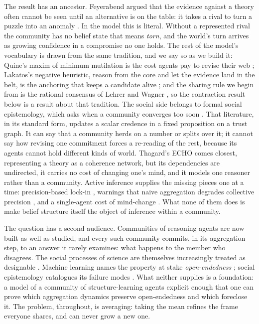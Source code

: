 The result has an ancestor. Feyerabend argued that the evidence against a theory often
cannot be seen until an alternative is on the table: it takes a rival to turn a puzzle into
an anomaly \citep{feyerabend1975}. In the model this is literal. Without a represented rival
the community has no belief state that means \emph{torn}, and the world's turn arrives as
growing confidence in a compromise no one holds. The rest of the model's vocabulary is drawn
from the same tradition, and we say so as we build it: Quine's maxim of minimum mutilation
is the cost agents pay to revise their web \citep{quine1978}; Lakatos's negative heuristic,
reason from the core and let the evidence land in the belt, is the anchoring that keeps a
candidate alive \citep{lakatos1970}; and the sharing rule we begin from is the rational
consensus of Lehrer and Wagner \citep{lehrer1981,degroot1974}, so the contraction result
below is a result about that tradition. The social side belongs to formal social
epistemology, which asks when a community converges too soon
\citep{zollman2010,zollman2013,oconnor2019,jonard2025,michelini2023}. That literature, in
its standard form, updates a scalar credence in a fixed proposition on a trust graph. It can
say that a community herds on a number or splits over it; it cannot say how revising one
commitment forces a re-reading of the rest, because its agents cannot hold different kinds
of world. Thagard's ECHO \citep{thagard1989,thagard1990} comes closest, representing a
theory as a coherence network, but its dependencies are undirected, it carries no cost of
changing one's mind, and it models one reasoner rather than a community. Active inference
supplies the missing pieces one at a time: precision-based lock-in \citep{albarracin2022},
warnings that naive aggregation degrades collective precision
\citep{friston2023federated,waade2025}, and a single-agent cost of mind-change
\citep{hyland2025}. What none of them does is make belief structure itself the object of
inference within a community.

The question has a second audience. Communities of reasoning agents are now built as well
as studied, and every such community commits, in its aggregation step, to an answer it
rarely examines: what happens to the member who disagrees. The social processes of science
are themselves increasingly treated as designable \citep{nielsen2022}. Machine learning
names the property at stake \emph{open-endedness} \citep{stanley2017oe,hughes2024}; social
epistemology catalogues its failure modes \citep{nguyen2018,zollman2010}. What neither
supplies is a foundation: a model of a community of structure-learning agents explicit
enough that one can prove which aggregation dynamics preserve open-endedness and which
foreclose it. The problem, throughout, is averaging: taking the mean refines the frame
everyone shares, and can never grow a new one.

